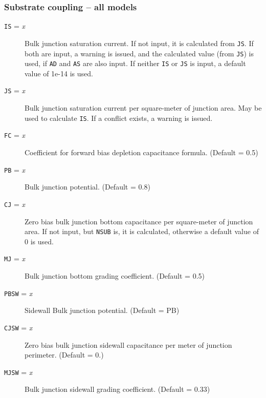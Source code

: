 \subsubsection{Substrate coupling -- all models}
\begin{description}

\item[{\tt IS} = {\it x}]
Bulk junction saturation current.  If not input, it is calculated from
{\tt JS}.  If both are input, a warning is issued, and the calculated
value (from {\tt JS}) is used, if {\tt AD} and {\tt AS} are also
input.  If neither {\tt IS} or {\tt JS} is input, a default value of
1e-14 is used.

\item[{\tt JS} = {\it x}]
Bulk junction saturation current per square-meter of junction area.  May
be used to calculate {\tt IS}.  If a conflict exists, a warning is
issued.

\item[{\tt FC} = {\it x}]
Coefficient for forward bias depletion capacitance formula. (Default =
0.5)

\item[{\tt PB} = {\it x}]
Bulk junction potential. (Default = 0.8)

\item[{\tt CJ} = {\it x}]
Zero bias bulk junction bottom capacitance per square-meter of junction
area.  If not input, but {\tt NSUB} is, it is calculated, otherwise a
default value of 0 is used.

\item[{\tt MJ} = {\it x}]
Bulk junction bottom grading coefficient.  (Default = 0.5)

\item[{\tt PBSW} = {\it x}]
Sidewall Bulk junction potential. (Default = PB)

\item[{\tt CJSW} = {\it x}]
Zero bias bulk junction sidewall capacitance per meter of junction
perimeter. (Default = 0.)

\item[{\tt MJSW} = {\it x}]
Bulk junction sidewall grading coefficient.  (Default = 0.33)

\end{description}
